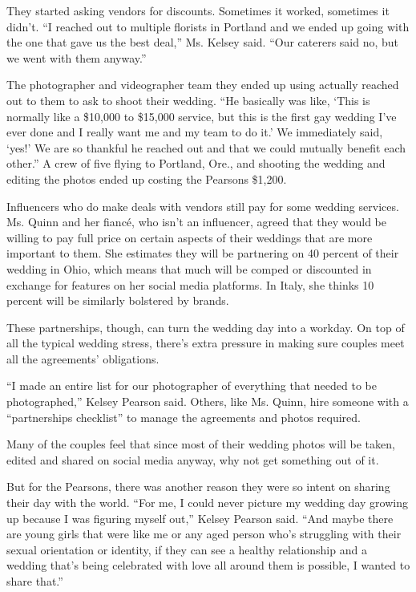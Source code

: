 They started asking vendors for discounts. Sometimes it worked,
sometimes it didn't. ``I reached out to multiple florists in Portland
and we ended up going with the one that gave us the best deal,'' Ms.
Kelsey said. ``Our caterers said no, but we went with them anyway.''

The photographer and videographer team they ended up using actually
reached out to them to ask to shoot their wedding. ``He basically was
like, `This is normally like a \$10,000 to \$15,000 service, but this is
the first gay wedding I've ever done and I really want me and my team to
do it.' We immediately said, `yes!' We are so thankful he reached out
and that we could mutually benefit each other.'' A crew of five flying
to Portland, Ore., and shooting the wedding and editing the photos ended
up costing the Pearsons \$1,200.

Influencers who do make deals with vendors still pay for some wedding
services. Ms. Quinn and her fiancé, who isn't an influencer, agreed that
they would be willing to pay full price on certain aspects of their
weddings that are more important to them. She estimates they will be
partnering on 40 percent of their wedding in Ohio, which means that much
will be comped or discounted in exchange for features on her social
media platforms. In Italy, she thinks 10 percent will be similarly
bolstered by brands.

These partnerships, though, can turn the wedding day into a workday. On
top of all the typical wedding stress, there's extra pressure in making
sure couples meet all the agreements' obligations.

``I made an entire list for our photographer of everything that needed
to be photographed,'' Kelsey Pearson said. Others, like Ms. Quinn, hire
someone with a ``partnerships checklist'' to manage the agreements and
photos required.

Many of the couples feel that since most of their wedding photos will be
taken, edited and shared on social media anyway, why not get something
out of it.

But for the Pearsons, there was another reason they were so intent on
sharing their day with the world. ``For me, I could never picture my
wedding day growing up because I was figuring myself out,'' Kelsey
Pearson said. ``And maybe there are young girls that were like me or any
aged person who's struggling with their sexual orientation or identity,
if they can see a healthy relationship and a wedding that's being
celebrated with love all around them is possible, I wanted to share
that.''

